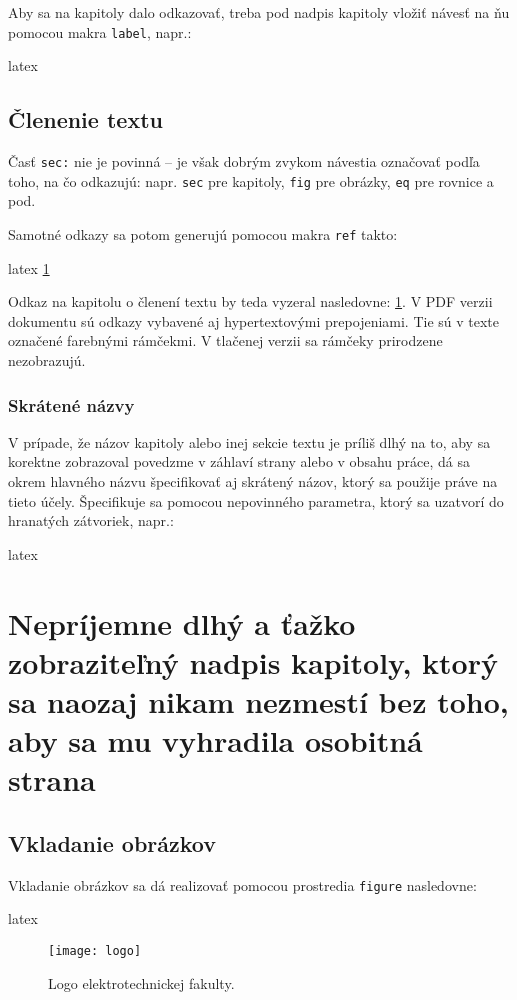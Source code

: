 Aby sa na kapitoly dalo odkazovať, treba pod nadpis kapitoly vložiť návesť na ňu pomocou makra \texttt{label}, napr.:
\begin{inlinecode}{latex}
\section{Členenie textu}
\label{sec:clenenie_textu}
\end{inlinecode}

Časť \texttt{sec:} nie je povinná -- je však dobrým zvykom návestia označovať podľa toho, na čo odkazujú: napr. \texttt{sec} pre kapitoly, \texttt{fig} pre obrázky, \texttt{eq} pre rovnice a pod.

Samotné odkazy sa potom generujú pomocou makra \texttt{ref} takto:
\begin{inlinecode}{latex}
\ref{sec:clenenie_textu}
\end{inlinecode}

Odkaz na kapitolu o členení textu by teda vyzeral nasledovne: \ref{sec:clenenie_textu}. V PDF verzii dokumentu sú odkazy vybavené aj hypertextovými prepojeniami. Tie sú v texte označené farebnými rámčekmi. V tlačenej verzii sa rámčeky prirodzene nezobrazujú.

\subsection{Skrátené názvy}

V prípade, že názov kapitoly alebo inej sekcie textu je príliš dlhý na to, aby sa korektne zobrazoval povedzme v záhlaví strany alebo v obsahu práce, dá sa okrem hlavného názvu špecifikovať aj skrátený názov, ktorý sa použije práve na tieto účely. Špecifikuje sa pomocou nepovinného parametra, ktorý sa uzatvorí do hranatých zátvoriek, napr.:
\begin{inlinecode}{latex}
\chapter[Skrátený nadpis kapitoly]{Nepríjemne dlhý a ťažko zobraziteľný nadpis kapitoly, ktorý sa naozaj nikam nezmestí bez toho, aby sa mu vyhradila osobitná strana}
\end{inlinecode}

\section{Vkladanie obrázkov}

Vkladanie obrázkov sa dá realizovať pomocou prostredia \texttt{figure} nasledovne:
\begin{inlinecode}{latex}
\begin{figure}
\centering
\texttt{[image: logo]}
\caption{Logo elektrotechnickej fakulty.}
\label{fig:obrazok}
\end{figure}
\end{inlinecode}

